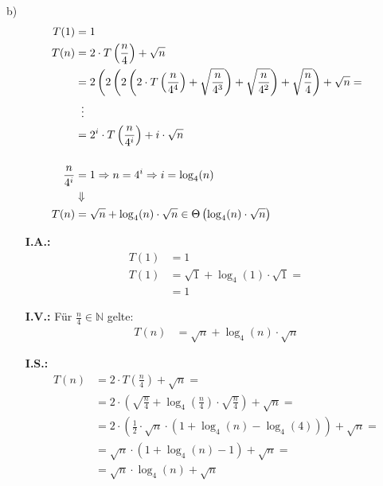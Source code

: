 b) \begin{align*}
	T(1) &= 1 \\
    T(n) &= 2 \cdot T\left( \frac{n}{4} \right) + \sqrt{n} \\
    &= 2\left( 2\left( 2\left( 2 \cdot T\left( \frac{n}{4^4} \right) + \sqrt{\frac{n}{4^3}} \right) + \sqrt{\frac{n}{4^2}} \right) + \sqrt{\frac{n}{4}} \right) + \sqrt{n} = \\
    &\hphantom{..} \vdots \\
    &= 2^i \cdot T\left( \frac{n}{4^i} \right) + i \cdot \sqrt{n} \\[0.5cm]
    \frac{n}{4^i} &= 1 \Rightarrow n = 4^i \Rightarrow i = \log_4(n) \\
    &\Downarrow \\
    T(n) &= \sqrt{n} + \log_4(n) \cdot \sqrt{n} \in \Theta \left( \log_4(n) \cdot \sqrt{n} \right)
\end{align*}

\begin{itemize}[nolistsep, noitemsep]
	\item[\textbf{I.A.:}] \begin{align*}
    		T(1) &= 1 \\
            T(1) &= \sqrt{1} + \log_4(1) \cdot \sqrt{1} = \\
            &= 1
    	\end{align*}
	\item[\textbf{I.V.:}] Für $\frac{n}{4} \in \mathbb{N}$ gelte: \begin{align*}
    		T(n) &= \sqrt{n} + \log_4(n) \cdot \sqrt{n}
    	\end{align*}
	\item[\textbf{I.S.:}] \begin{align*}
    		T(n) &= 2 \cdot T\left( \frac{n}{4} \right) + \sqrt{n} = \\
            &= 2 \cdot \left( \sqrt{\frac{n}{4}} + \log_4\left( \frac{n}{4} \right) \cdot \sqrt{\frac{n}{4}} \right) + \sqrt{n} = \\
            &= 2 \cdot \left( \frac{1}{2} \cdot \sqrt{n} \cdot \left( 1 + \log_4(n) - \log_4(4) \right) \right) + \sqrt{n} = \\
            &= \sqrt{n} \cdot \left( 1 + \log_4(n) - 1 \right) + \sqrt{n} = \\
            &= \sqrt{n} \cdot \log_4(n) + \sqrt{n}
    	\end{align*}
\end{itemize}
\nuffsaid

\newpage

